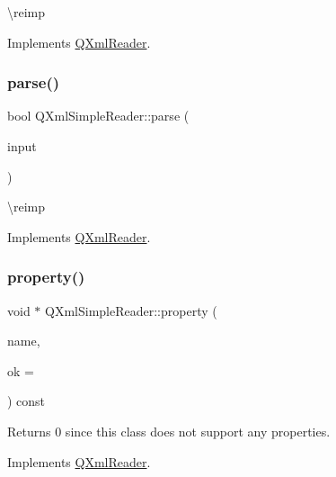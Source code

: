 \textbackslash{}reimp 

Implements \mbox{\hyperlink{class_q_xml_reader_ade3f9c1c3b56110187deab81cd837cd5}{Q\+Xml\+Reader}}.

\mbox{\label{class_q_xml_simple_reader_a664631907374b7d0f7b492ef65f418d9}} 
\subsubsection{\texorpdfstring{parse()}{parse()}}
{\footnotesize\ttfamily bool Q\+Xml\+Simple\+Reader\+::parse (\begin{DoxyParamCaption}\item[{const \mbox{\hyperlink{class_q_xml_input_source}{Q\+Xml\+Input\+Source}} \&}]{input }\end{DoxyParamCaption})\hspace{0.3cm}{\ttfamily [virtual]}}

\textbackslash{}reimp 

Implements \mbox{\hyperlink{class_q_xml_reader_a5f7ba5edeea40d6042c63beab50866b2}{Q\+Xml\+Reader}}.

\mbox{\label{class_q_xml_simple_reader_a06e5d853a8299d74a0a3adc56e0a02ee}} 
\subsubsection{\texorpdfstring{property()}{property()}}
{\footnotesize\ttfamily void $\ast$ Q\+Xml\+Simple\+Reader\+::property (\begin{DoxyParamCaption}\item[{const \mbox{\hyperlink{class_q_string}{Q\+String}} \&}]{name,  }\item[{bool $\ast$}]{ok = {} }\end{DoxyParamCaption}) const\hspace{0.3cm}{\ttfamily [virtual]}}

Returns 0 since this class does not support any properties. 

Implements \mbox{\hyperlink{class_q_xml_reader_a88ea75a8b783f8ef6959d9d83402c579}{Q\+Xml\+Reader}}.

\mbox{\label{class_q_xml_simple_reader_ae3561b9c7507e03b87534f505fec2857}} 
